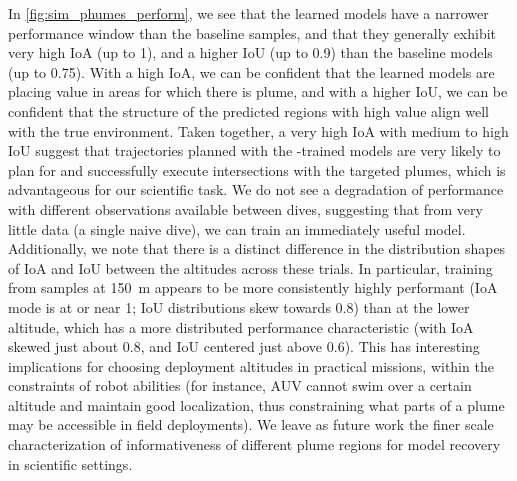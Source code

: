 In \cref{fig:sim_phumes_perform}, we see that the learned models have a narrower performance window than the baseline samples, and that they generally exhibit very high IoA (up to 1), and a higher IoU (up to 0.9) than the baseline models (up to 0.75). With a high IoA, we can be confident that the learned models are placing value in areas for which there is plume, and with a higher IoU, we can be confident that the structure of the predicted regions with high value align well with the true environment. Taken together, a very high IoA with medium to high IoU suggest that trajectories planned with the \PHORTEX-trained models are very likely to plan for and successfully execute intersections with the targeted plumes, which is advantageous for our scientific task. We do not see a degradation of performance with different observations available between dives, suggesting that from very little data (a single naive dive), we can train an immediately useful model. Additionally, we note that there is a distinct difference in the distribution shapes of IoA and IoU between the altitudes across these trials. In particular, training from samples at \SI{150}{\meter} appears to be more consistently highly performant (IoA mode is at or near 1; IoU distributions skew towards 0.8) than at the lower altitude, which has a more distributed performance characteristic (with IoA skewed just about 0.8, and IoU centered just above 0.6). This has interesting implications for choosing deployment altitudes in practical missions, within the constraints of robot abilities (for instance, AUV \Sentry cannot swim over a certain altitude and maintain good localization, thus constraining what parts of a plume may be accessible in field deployments). We leave as future work the finer scale characterization of informativeness of different plume regions for model recovery in scientific settings.


